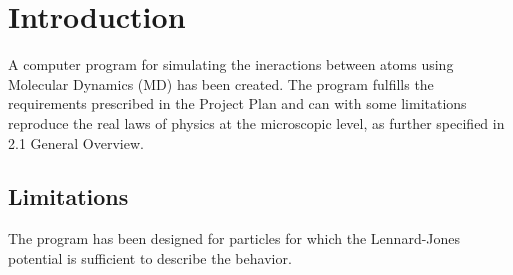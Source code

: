 \section{Introduction}
A computer program for simulating the ineractions between atoms using Molecular Dynamics (MD) has been created. The program fulfills the requirements prescribed in the Project Plan and can with some limitations reproduce the real laws of physics at the microscopic level, as further specified in 2.1 General Overview.
\subsection{Limitations}
The program has been designed for particles for which the Lennard-Jones potential is sufficient to describe the behavior.
